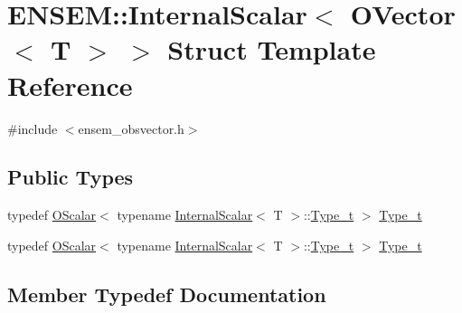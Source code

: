 \hypertarget{structENSEM_1_1InternalScalar_3_01OVector_3_01T_01_4_01_4}{}\section{E\+N\+S\+EM\+:\+:Internal\+Scalar$<$ O\+Vector$<$ T $>$ $>$ Struct Template Reference}
\label{structENSEM_1_1InternalScalar_3_01OVector_3_01T_01_4_01_4}


{\ttfamily \#include $<$ensem\+\_\+obsvector.\+h$>$}

\subsection*{Public Types}
\begin{DoxyCompactItemize}
\item 
typedef \mbox{\hyperlink{classENSEM_1_1OScalar}{O\+Scalar}}$<$ typename \mbox{\hyperlink{structENSEM_1_1InternalScalar}{Internal\+Scalar}}$<$ T $>$\+::\mbox{\hyperlink{structENSEM_1_1InternalScalar_3_01OVector_3_01T_01_4_01_4_a61185c961c0397adc786d26e877adba9}{Type\+\_\+t}} $>$ \mbox{\hyperlink{structENSEM_1_1InternalScalar_3_01OVector_3_01T_01_4_01_4_a61185c961c0397adc786d26e877adba9}{Type\+\_\+t}}
\item 
typedef \mbox{\hyperlink{classENSEM_1_1OScalar}{O\+Scalar}}$<$ typename \mbox{\hyperlink{structENSEM_1_1InternalScalar}{Internal\+Scalar}}$<$ T $>$\+::\mbox{\hyperlink{structENSEM_1_1InternalScalar_3_01OVector_3_01T_01_4_01_4_a61185c961c0397adc786d26e877adba9}{Type\+\_\+t}} $>$ \mbox{\hyperlink{structENSEM_1_1InternalScalar_3_01OVector_3_01T_01_4_01_4_a61185c961c0397adc786d26e877adba9}{Type\+\_\+t}}
\end{DoxyCompactItemize}


\subsection{Member Typedef Documentation}
\mbox{\label{structENSEM_1_1InternalScalar_3_01OVector_3_01T_01_4_01_4_a61185c961c0397adc786d26e877adba9}} 
